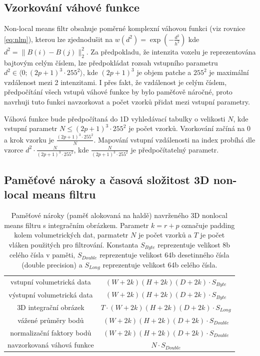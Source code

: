 \subsection*{Vzorkování váhové funkce}
\label{subsec:nlm:sampling}
Non-local means filtr obsahuje poměrné komplexní váhovou funkci (viz rovnice \ref{eq:nlm}), kterou lze zjednodušit na $w(d^2) = \exp(-\frac{d^2}{h^2})$ kde $d^2 = \|B(i) - B(j)\|_2^2$. Za předpokladu, že intenzita voxelu je reprezentována bajtovým celým číslem, lze předpokládat rozsah vstupního parametru $d^2 \in \langle0;(2p + 1)^3 \cdot 255^2\rangle$, kde $(2p + 1)^3$ je objem patche a $255^2$ je maximální  vzdálenost mezi 2 intenzitami. I přes fakt, že vzdálenost je celým číslem, předpočítání všech vstupů váhové funkce by bylo paměťově náročné, proto navrhuji tuto funkci navzorkovat a počet vzorků přidat mezi vstupní parametry.

Váhová funkce bude předpočítaná do 1D vyhledávací tabulky o velikosti $N$, kde vstupní parametr $N \leq (2p + 1)^3 \cdot 255^2$ je počet vzorků. Vzorkování začíná na $0$ a krok vzorku je $\frac{(2p + 1)^3 \cdot 255^2}{N}$. Mapování vstupní vzdálenosti na index probíhá dle vzorce $d^2 \cdot \frac{N}{(2p + 1)^3 \cdot 255^2}$, kde $\frac{N}{(2p + 1)^3 \cdot 255^2}$ je předpočítatelný parametr.

\subsection*{Paměťové nároky a časová složitost 3D non-local means filtru}
\begin{table} [H]
    \centering
    \begin{tabular}{|c|c|}
        \hline
        vstupní volumetrická data & $(W + 2k)(H + 2k)(D + 2k) \cdot S_{Byte}$ \\
        výstupní volumetrická data & $(W + 2k)(H + 2k)(D + 2k)
        \cdot S_{Byte}$ \\
        \hline
        3D integrační obrázek & $T \cdot (W + 2k)(H + 2k)(D + 2k) \cdot S_{Long}$ \\
        vážené průměry bodů & $(W + 2k)(H + 2k)(D + 2k) \cdot S_{Double}$ \\
        normalizační faktory bodů & $(W + 2k)(H + 2k)(D + 2k) \cdot S_{Double}$ \\
        navzorkovaná váhová funkce & $N \cdot S_{Double}$ \\
        \hline
    \end{tabular}
    \caption{Paměťové nároky (paměť alokovaná na haldě) navrženého 3D nonlocal means filtru s integračním obrázkem. Parametr $k = r + p$ označuje padding kolem volumetrických dat, parmatetr $N$ je počet vzorků a $T$ je počet vláken použitých pro filtrování. Konstanta $S_{Byte}$ reprezentuje velikost 8b celého čísla v paměti, $S_{Double}$ reprezentuje velikost 64b desetinného čísla (double precision) a $S_{Long}$ reprezentuje velikost 64b celého čísla.}
\end{table}

